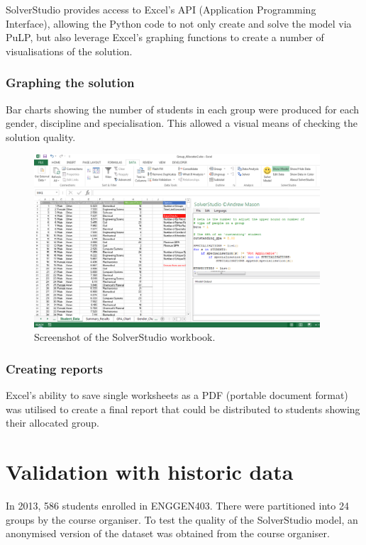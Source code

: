 \documentclass[12pt]{ORSNZ}
\begin{document}
SolverStudio provides access to Excel's API (Application Programming Interface), allowing the Python code to not only create and solve the model via PuLP, but also leverage Excel's graphing functions to create a number of visualisations of the solution.

\subsubsection{Graphing the solution}
Bar charts showing the number of students in each group were produced for each gender, discipline and specialisation. This allowed a visual means of checking the solution quality. 

\begin{figure}[!ht]
	\centering
	\includegraphics[width=0.95\textwidth]{solverstudio_screenshot.pdf}
	\caption{Screenshot of the SolverStudio workbook.}
\end{figure}

\subsubsection{Creating reports}
Excel's ability to save single worksheets as a PDF (portable document format) was utilised to create a final report that could be distributed to students showing their allocated group.

\section{Validation with historic data}
In 2013, 586 students enrolled in ENGGEN403. There were partitioned into 24 groups by the course organiser. To test the quality of the SolverStudio model, an anonymised version of the dataset was obtained from the course organiser.
\end{document}
